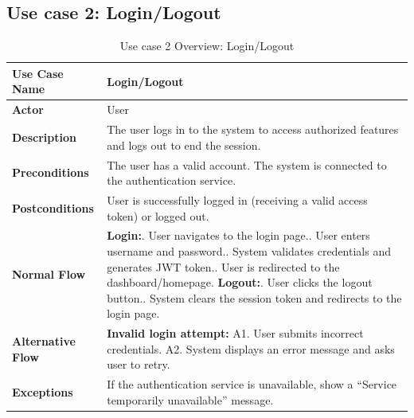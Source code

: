 \subsection{Use case 2: Login/Logout}
\begin{table}[H]
    \centering
    \renewcommand{\arraystretch}{1.5}
    \begin{tabularx}{\textwidth}{|l|X|}
        \hline
        \textbf{Use Case Name} & Login/Logout \\
        \hline
        \textbf{Actor} & User \\
        \hline
        \textbf{Description} & The user logs in to the system to access authorized features and logs out to end the session. \\
        \hline
        \textbf{Preconditions} & The user has a valid account.\newline
        The system is connected to the authentication service. \\
        \hline
        \textbf{Postconditions} & User is successfully logged in (receiving a valid access token) or logged out. \\
        \hline
        \textbf{Normal Flow} & 
        \textbf{Login:}\newline
        1. User navigates to the login page.\newline
        2. User enters username and password.\newline
        3. System validates credentials and generates JWT token.\newline
        4. User is redirected to the dashboard/homepage.\newline
        \textbf{Logout:}\newline
        5. User clicks the logout button.\newline
        6. System clears the session token and redirects to the login page. \\
        \hline
        \textbf{Alternative Flow} & 
        \textbf{Invalid login attempt:}\newline
        A1. User submits incorrect credentials.\newline
        A2. System displays an error message and asks user to retry. \\
        \hline
        \textbf{Exceptions} & If the authentication service is unavailable, show a ``Service temporarily unavailable'' message. \\
        \hline
    \end{tabularx}
    \caption{Use case 2 Overview: Login/Logout}\label{tab:uc2}
\end{table}

